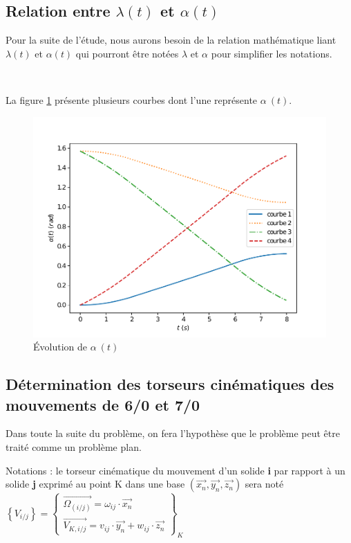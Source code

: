 \subsection{Relation entre $\lambda(t)$ et $\alpha(t)$}

Pour la suite de l'étude, nous aurons besoin de la relation mathématique liant $\lambda(t)$ et $\alpha(t)$ qui pourront être notées  $\lambda$ et $\alpha$ pour simplifier les notations.


~\

La figure \ref{fig14a} présente plusieurs courbes dont l'une représente $\alpha\ (t)$.

\begin{figure}[!h]
 \centering\includegraphics[width=0.7\linewidth]{img/fig14a}
 \caption{Évolution de $\alpha\ (t)$}
 \label{fig14a}
\end{figure}


\subsection{Détermination des torseurs cinématiques des mouvements de 6/0 et 7/0}

Dans toute la suite du problème, on fera l'hypothèse que le problème peut être traité comme un problème plan.

Notations : le torseur cinématique du mouvement d'un solide \textbf{i} par rapport à un solide \textbf{j} exprimé au
point K dans une base $\left(\overrightarrow{x_n},\overrightarrow{y_n},\overrightarrow{z_n}\right)$ sera noté
$\left\{V_{i/j}\right\}=\left\{\begin{array}{c}\overrightarrow{\Omega_{(i/j)}}=\omega_{ij}\cdot \overrightarrow{x_n} \\
\overrightarrow{V_{K,i/j}}=v_{ij}\cdot \overrightarrow{y_n}+w_{ij}\cdot \overrightarrow{z_n}
\end{array}\right\}_K$

